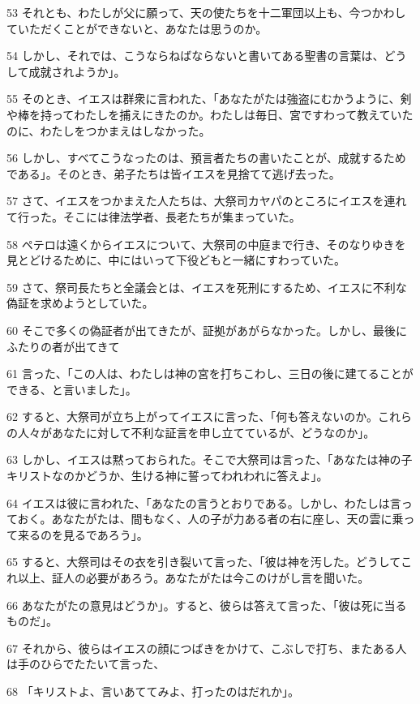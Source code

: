 \par 53 それとも、わたしが父に願って、天の使たちを十二軍団以上も、今つかわしていただくことができないと、あなたは思うのか。
\par 54 しかし、それでは、こうならねばならないと書いてある聖書の言葉は、どうして成就されようか」。
\par 55 そのとき、イエスは群衆に言われた、「あなたがたは強盗にむかうように、剣や棒を持ってわたしを捕えにきたのか。わたしは毎日、宮ですわって教えていたのに、わたしをつかまえはしなかった。
\par 56 しかし、すべてこうなったのは、預言者たちの書いたことが、成就するためである」。そのとき、弟子たちは皆イエスを見捨てて逃げ去った。
\par 57 さて、イエスをつかまえた人たちは、大祭司カヤパのところにイエスを連れて行った。そこには律法学者、長老たちが集まっていた。
\par 58 ペテロは遠くからイエスについて、大祭司の中庭まで行き、そのなりゆきを見とどけるために、中にはいって下役どもと一緒にすわっていた。
\par 59 さて、祭司長たちと全議会とは、イエスを死刑にするため、イエスに不利な偽証を求めようとしていた。
\par 60 そこで多くの偽証者が出てきたが、証拠があがらなかった。しかし、最後にふたりの者が出てきて
\par 61 言った、「この人は、わたしは神の宮を打ちこわし、三日の後に建てることができる、と言いました」。
\par 62 すると、大祭司が立ち上がってイエスに言った、「何も答えないのか。これらの人々があなたに対して不利な証言を申し立てているが、どうなのか」。
\par 63 しかし、イエスは黙っておられた。そこで大祭司は言った、「あなたは神の子キリストなのかどうか、生ける神に誓ってわれわれに答えよ」。
\par 64 イエスは彼に言われた、「あなたの言うとおりである。しかし、わたしは言っておく。あなたがたは、間もなく、人の子が力ある者の右に座し、天の雲に乗って来るのを見るであろう」。
\par 65 すると、大祭司はその衣を引き裂いて言った、「彼は神を汚した。どうしてこれ以上、証人の必要があろう。あなたがたは今このけがし言を聞いた。
\par 66 あなたがたの意見はどうか」。すると、彼らは答えて言った、「彼は死に当るものだ」。
\par 67 それから、彼らはイエスの顔につばきをかけて、こぶしで打ち、またある人は手のひらでたたいて言った、
\par 68 「キリストよ、言いあててみよ、打ったのはだれか」。
